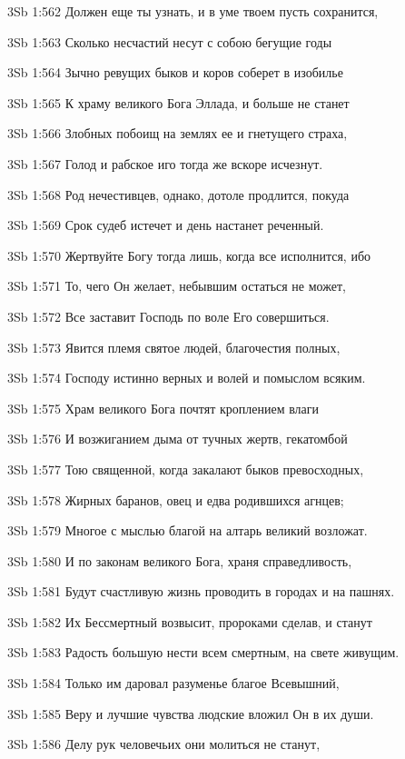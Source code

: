 \vs 3Sb 1:562 Должен еще ты узнать, и в уме твоем пусть сохранится, 

\vs 3Sb 1:563 Сколько несчастий несут с собою бегущие годы

\vs 3Sb 1:564 Зычно ревущих быков и коров соберет в изобилье 

\vs 3Sb 1:565 К храму великого Бога Эллада, и больше не станет 

\vs 3Sb 1:566 Злобных побоищ на землях ее и гнетущего страха, 

\vs 3Sb 1:567 Голод и рабское иго тогда же вскоре исчезнут. 

\vs 3Sb 1:568 Род нечестивцев, однако, дотоле продлится, покуда 

\vs 3Sb 1:569 Срок судеб истечет и день настанет реченный. 

\vs 3Sb 1:570 Жертвуйте Богу тогда лишь, когда все исполнится, ибо 

\vs 3Sb 1:571 То, чего Он желает, небывшим остаться не может, 

\vs 3Sb 1:572 Все заставит Господь по воле Его совершиться.

\vs 3Sb 1:573 Явится племя святое людей, благочестия полных, 

\vs 3Sb 1:574 Господу истинно верных и волей и помыслом всяким.

\vs 3Sb 1:575 Храм великого Бога почтят кроплением влаги 

\vs 3Sb 1:576 И возжиганием дыма от тучных жертв, гекатомбой 

\vs 3Sb 1:577 Тою священной, когда закалают быков превосходных, 

\vs 3Sb 1:578 Жирных баранов, овец и едва родившихся агнцев; 

\vs 3Sb 1:579 Многое с мыслью благой на алтарь великий возложат.

\vs 3Sb 1:580 И по законам великого Бога, храня справедливость,

\vs 3Sb 1:581 Будут счастливую жизнь проводить в городах и на пашнях. 

\vs 3Sb 1:582 Их Бессмертный возвысит, пророками сделав, и станут 

\vs 3Sb 1:583 Радость большую нести всем смертным, на свете живущим. 

\vs 3Sb 1:584 Только им даровал разуменье благое Всевышний,

\vs 3Sb 1:585 Веру и лучшие чувства людские вложил Он в их души. 

\vs 3Sb 1:586 Делу рук человечьих они молиться не станут, 


